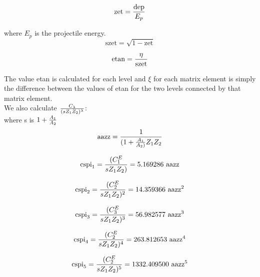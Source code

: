 \begin{equation}
\mathrm{zet} = {\mathrm{dep} \over E_p}
\end{equation}

\noindent where $E_p$ is the projectile energy.\\

\begin{equation}
\mathrm{szet} = \sqrt{1 - \mathrm{zet}}
\end{equation}

\begin{equation}
\mathrm{etan} = {\eta \over \mathrm{szet}}
\end{equation}

\noindent The value etan is calculated for each level and $\xi$ for each
matrix element is simply the difference between the values of etan for the
two levels connected by that matrix element.\\

\noindent We also calculate ${C_\lambda \over (s Z_1 Z_2)^\lambda}$:\\

\noindent where s is $1 + {A_1 \over A_2}$\\

\begin{equation}
\mathrm{aazz} = {1 \over {(1 + {A_1 \over A_2)}} Z_1 Z_2}
\end{equation}

\begin{equation}
\mathrm{cspi}_1 = {(C_1^E \over s Z_1 Z_2)} = 5.169286 ~\mathrm{aazz}
\end{equation}

\begin{equation}
\mathrm{cspi}_2 = {(C_2^E \over s Z_1 Z_2)^2} = 14.359366 ~\mathrm{aazz}^2
\end{equation}

\begin{equation}
\mathrm{cspi}_3 = {(C_3^E \over s Z_1 Z_2)^3} = 56.982577 ~\mathrm{aazz}^3
\end{equation}

\begin{equation}
\mathrm{cspi}_4 = {(C_2^E \over s Z_1 Z_2)^4} = 263.812653 ~\mathrm{aazz}^4
\end{equation}

\begin{equation}
\mathrm{cspi}_5 = {(C_2^E \over s Z_1 Z_2)^5} = 1332.409500 ~\mathrm{aazz}^5
\end{equation}

